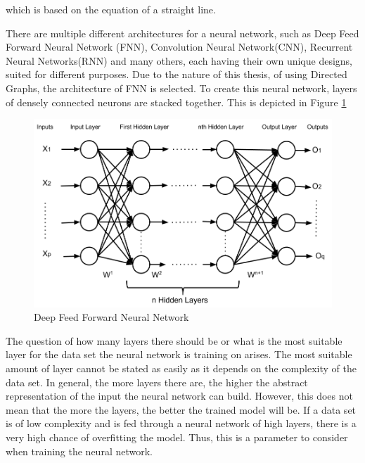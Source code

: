 \documentclass{tum-book}
\begin{document}
        \noindent
        which is based on the equation of a straight line. 

        \newpage\noindent
        There are multiple different architectures for a neural network, such as Deep Feed Forward Neural Network (FNN), Convolution Neural Network(CNN), Recurrent Neural Networks(RNN) and many others, each having their own unique designs, suited for different purposes. Due to the nature of this thesis, of using Directed Graphs, the architecture of FNN is selected. To create this neural network, layers of densely connected neurons are stacked together. This is depicted in Figure \ref{fig:Deep Feed Forward Neural Network}
        
        \bigskip\begin{figure}[h]
            \centering
            \includegraphics[scale=0.5]{myFiles/myImages/FNN.png}
            \caption{Deep Feed Forward Neural Network\cite{DeepFeedForwardNeuralNetwork}}
            \label{fig:Deep Feed Forward Neural Network}
        \end{figure}
        
        \bigskip\noindent
        The question of how many layers there should be or what is the most suitable layer for the data set the neural network is training on arises. The most suitable amount of layer cannot be stated as easily as it depends on the complexity of the data set. In general, the more layers there are, the higher the abstract representation of the input the neural network can build. However, this does not mean that the more the layers, the better the trained model will be. If a data set is of low complexity and is fed through a neural network of high layers, there is a very high chance of overfitting the model. Thus, this is a parameter to consider when training the neural network.
\end{document}
